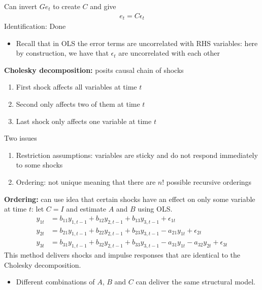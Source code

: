 \documentclass{beamer}
\begin{document}
\begin{frame}
  Can invert $Ge_t$ to create $C$ and give
  \begin{align}
    e_t= C\epsilon_t
  \end{align}
  \medskip
  Identification: Done
  \begin{itemize}
    \item Recall that in OLS the error terms are uncorrelated with RHS variables: here by construction, we have that $\epsilon_t$ are uncorrelated with each other
  \end{itemize}  
\end{frame}

\begin{frame}
  \textbf{Cholesky decomposition:} posits causal chain of shocks
  \begin{enumerate}
  \item First shock affects all variables at time $t$
  \item Second only affects two of them at time $t$
  \item Last shock only affects one variable at time $t$
\end{enumerate}
 Two issues
 \begin{enumerate}
   \item Restriction assumptions: variables are sticky and do not respond immediately to some shocks
   \item Ordering: not unique meaning that there are $n!$ possible recursive orderings
 \end{enumerate} 
\end{frame}

\begin{frame}
  \textbf{Ordering:} can use idea that certain shocks have an effect on only some variable at time $t$: let $C=I$ and estimate $A$ and $B$ using OLS.
\begin{align}
  y_{1t} &= b_{11}y_{1,t-1} + b_{12}y_{2,t-1} + b_{13}y_{3,t-1} + \epsilon_{1t}\\ \nonumber
  y_{2t} &= b_{21}y_{1,t-1} + b_{22}y_{2,t-1} + b_{23}y_{3,t-1}-a_{21}y_{1t} + \epsilon_{2t}\\ \nonumber
  y_{3t} &= b_{31}y_{1,t-1} + b_{32}y_{2,t-1} + b_{33}y_{3,t-1}-a_{31}y_{1t} - a_{32}y_{2t} + \epsilon_{3t}
\end{align}
\medskip
 This method delivers shocks and impulse responses that are identical to the Cholesky decomposition.
 \begin{itemize}
   \item Different combinations of $A$, $B$ and $C$ can deliver the same structural model.
 \end{itemize}
\end{frame}
\end{document}
